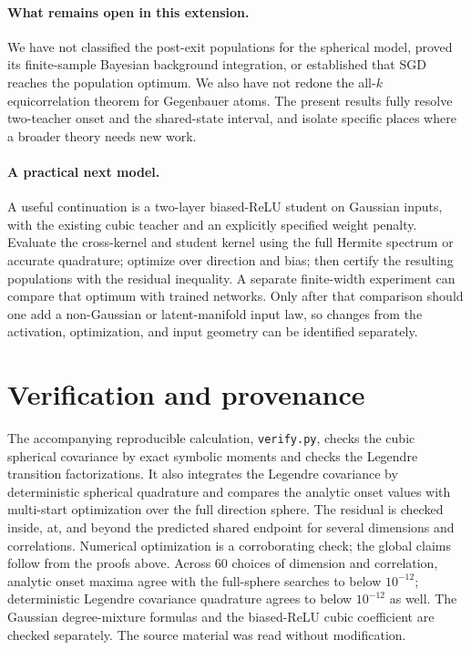 \documentclass[11pt]{article}
\theoremstyle{remark}
\begin{document}
\paragraph{What remains open in this extension.}
We have not classified the post-exit populations for the spherical model,
proved its finite-sample Bayesian background integration, or established
that SGD reaches the population optimum. We also have not redone the
all-$k$ equicorrelation theorem for Gegenbauer atoms. The present results
fully resolve two-teacher onset and the shared-state interval, and isolate
specific places where a broader theory needs new work.

\paragraph{A practical next model.}
A useful continuation is a two-layer biased-ReLU student on Gaussian
inputs, with the existing cubic teacher and an explicitly specified weight
penalty. Evaluate the cross-kernel and student kernel using the full
Hermite spectrum or accurate quadrature; optimize over direction and bias;
then certify the resulting populations with the residual inequality. A
separate finite-width experiment can compare that optimum with trained
networks. Only after that comparison should one add a non-Gaussian or
latent-manifold input law, so changes from the activation, optimization,
and input geometry can be identified separately.

\section{Verification and provenance}
The accompanying reproducible calculation, \texttt{verify.py}, checks
the cubic spherical covariance by exact symbolic moments and checks the
Legendre transition factorizations. It also integrates the Legendre
covariance by deterministic spherical quadrature and compares the analytic
onset values with multi-start optimization over the full direction sphere.
The residual is checked inside, at, and beyond the predicted shared
endpoint for several dimensions and correlations. Numerical optimization
is a corroborating check; the global claims follow from the proofs above.
Across 60 choices of dimension and correlation, analytic onset maxima
agree with the full-sphere searches to below $10^{-12}$; deterministic
Legendre covariance quadrature agrees to below $10^{-12}$ as well. The
Gaussian degree-mixture formulas and the biased-ReLU cubic coefficient
are checked separately. The source material was read without modification.
\end{document}
